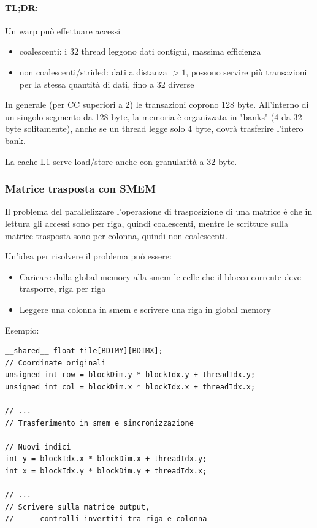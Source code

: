 \paragraph{TL;DR:} Un warp può effettuare accessi
\begin{itemize}
	\item coalescenti: i 32 thread leggono dati contigui, massima efficienza
	\item non coalescenti/strided: dati a distanza $>1$, possono servire più transazioni per la stessa quantità di dati, fino a 32 diverse
\end{itemize}

In generale (per CC superiori a 2) le transazioni coprono 128 byte. All'interno di un singolo segmento da 128 byte, la memoria è organizzata in "banks" (4 da 32 byte solitamente), anche se un thread legge solo 4 byte, dovrà trasferire l'intero bank.

La cache L1 serve load/store anche con granularità a 32 byte.

\subsubsection{Matrice trasposta con SMEM}

Il problema del parallelizzare l'operazione di trasposizione di una matrice  è che in lettura gli accessi sono per riga, quindi coalescenti, mentre le scritture sulla matrice trasposta sono per colonna, quindi non coalescenti.

Un'idea per risolvere il problema può essere: 
\begin{itemize}
	\item Caricare dalla global memory alla smem le celle che il blocco corrente deve trasporre, riga per riga
	
	\item Leggere una colonna in smem e scrivere una riga in global memory
\end{itemize}

Esempio:
\begin{verbatim}
__shared__ float tile[BDIMY][BDIMX];
// Coordinate originali
unsigned int row = blockDim.y * blockIdx.y + threadIdx.y;
unsigned int col = blockDim.x * blockIdx.x + threadIdx.x;

// ...
// Trasferimento in smem e sincronizzazione

// Nuovi indici
int y = blockIdx.x * blockDim.x + threadIdx.y;
int x = blockIdx.y * blockDim.y + threadIdx.x;

// ...
// Scrivere sulla matrice output, 
//		controlli invertiti tra riga e colonna
\end{verbatim}